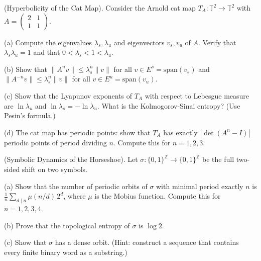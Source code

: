 \begin{exercise}
(Hyperbolicity of the Cat Map). Consider the Arnold cat map $T_A: \mathbb{T}^2 \to \mathbb{T}^2$ with $A = \begin{pmatrix} 2 & 1 \\ 1 & 1\end{pmatrix}$.

(a) Compute the eigenvalues $\lambda_s, \lambda_u$ and eigenvectors $v_s, v_u$ of $A$. Verify that $\lambda_s \lambda_u = 1$ and that $0 < \lambda_s < 1 < \lambda_u$.

(b) Show that $\|A^n v\| \leq \lambda_s^n \|v\|$ for all $v \in E^s = \text{span}(v_s)$ and $\|A^{-n} v\| \leq \lambda_s^n \|v\|$ for all $v \in E^u = \text{span}(v_u)$.

(c) Show that the Lyapunov exponents of $T_A$ with respect to Lebesgue measure are $\ln \lambda_u$ and $\ln \lambda_s = -\ln \lambda_u$. What is the Kolmogorov-Sinai entropy? (Use Pesin's formula.)

(d) The cat map has periodic points: show that $T_A$ has exactly $|{\det(A^n - I)}|$ periodic points of period dividing $n$. Compute this for $n = 1, 2, 3$.


\bigskip

\end{exercise}


\begin{exercise}
(Symbolic Dynamics of the Horseshoe). Let $\sigma: \{0, 1\}^\mathbb{Z} \to \{0, 1\}^\mathbb{Z}$ be the full two-sided shift on two symbols.

(a) Show that the number of periodic orbits of $\sigma$ with minimal period exactly $n$ is $\frac{1}{n}\sum_{d \mid n} \mu(n/d) \, 2^d$, where $\mu$ is the Mobius function. Compute this for $n = 1, 2, 3, 4$.

(b) Prove that the topological entropy of $\sigma$ is $\log 2$.

(c) Show that $\sigma$ has a dense orbit. (Hint: construct a sequence that contains every finite binary word as a substring.)


\bigskip

\end{exercise}


